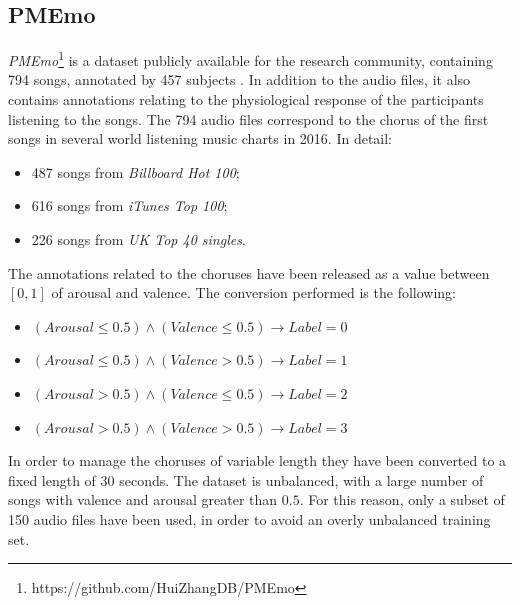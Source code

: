 \documentclass[runningheads]{llncs}
\begin{document}
\subsection{PMEmo}

\textit{PMEmo}\footnote{https://github.com/HuiZhangDB/PMEmo} is a dataset publicly available for the research community, containing 794 songs, annotated by 457 subjects \cite{zhang2018pmemo}. In addition to the audio files, it also contains annotations relating to the physiological response of the participants listening to the songs. The 794 audio files correspond to the chorus of the first songs in several world listening music charts in 2016. In detail:
\begin{itemize}
    \item 487 songs from \textit{Billboard Hot 100};
    \item 616 songs from \textit{iTunes Top 100};
    \item 226 songs from \textit{UK Top 40 singles}.
\end{itemize}

The annotations related to the choruses have been released as a value between $[0, 1]$ of arousal and valence. The conversion performed is the following:
\begin{itemize}
    \item $(Arousal \le 0.5) \wedge (Valence \le 0.5) \to Label = 0$
    \item $(Arousal \le 0.5) \wedge (Valence > 0.5) \to Label = 1$
    \item $(Arousal > 0.5) \wedge (Valence \le 0.5) \to Label = 2$
    \item $(Arousal > 0.5) \wedge (Valence > 0.5) \to Label = 3$
\end{itemize}




In order to manage the choruses of variable length they have been converted to a fixed length of 30 seconds. %
The dataset is unbalanced, with a large number of songs with valence and arousal greater than $0.5$. For this reason, only a subset of 150 audio files have been used, in order to avoid an overly unbalanced training set. %

\end{document}
